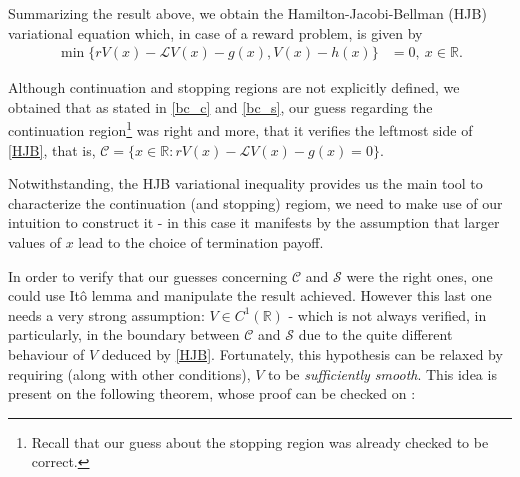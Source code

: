 Summarizing the result above, we obtain the Hamilton-Jacobi-Bellman (HJB) variational equation which, in case of a reward problem, is given by
\begin{align}
 \min \{ r V(x)-\mathcal{L}V(x)-g(x), V(x)-h(x) \}&=0, \ x\in \mathds{R}.
\label{HJB}
\end{align}

Although continuation and stopping regions are not explicitly defined, we obtained that as stated in \eqref{bc_c} and \eqref{bc_s}, our guess regarding the continuation region\footnote{Recall that our guess about the stopping region was already checked to be correct.} was right and more, that it verifies the leftmost side of \eqref{HJB}, that is,
$\mathcal{C}=\{ x\in \mathds{R}: r V(x)-\mathcal{L}V(x)-g(x)=0 \}.$

Notwithstanding, the HJB variational inequality provides us the main tool to characterize the continuation (and stopping) regiom, we need to make use of our intuition to construct it - in this case it manifests by the assumption that larger values of $x$ lead to the choice of termination payoff.

In order to verify that our guesses concerning $\mathcal{C}$ and $\mathcal{S}$ were the right ones, one could use Itô lemma and manipulate the result achieved. However this last one needs a very strong assumption: $V \in C^1(\mathds{R})$ - which is not always verified, in particularly, in the boundary between $\mathcal{C}$ and $\mathcal{S}$ due to the quite different behaviour of $V$ deduced by \eqref{HJB}. Fortunately, this hypothesis can be relaxed by requiring (along with other conditions), $V$ to be \textit{sufficiently smooth}. This idea is present on the following theorem, whose proof can be checked on \cite{ross}:

